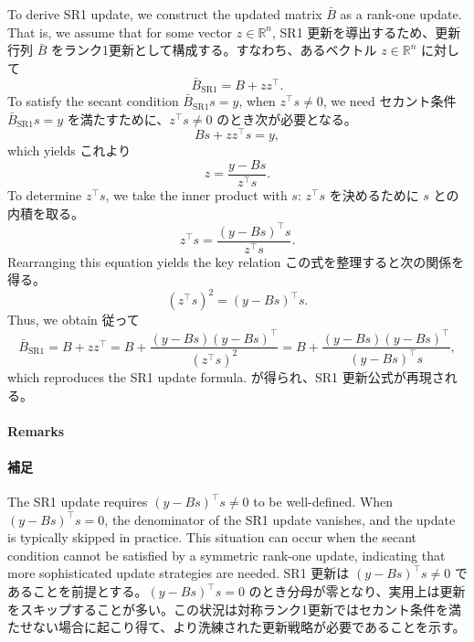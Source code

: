 \documentclass[0_main]{subfiles}
\begin{document}
\ifEn
    To derive SR1 update, we construct the updated matrix $\bar{B}$ as a rank-one update. That is, we assume that for some vector $z \in \mathbb{R}^n$,
\else
    SR1 更新を導出するため、更新行列 $\bar{B}$ をランク1更新として構成する。すなわち、あるベクトル $z \in \mathbb{R}^n$ に対して
\fi
\begin{equation*}
    \bar{B}_{\mathrm{SR1}} = B + z z^\top.
\end{equation*}
\ifEn
    To satisfy the secant condition $\bar{B}_{\mathrm{SR1}} s = y$, when $z^\top s \neq 0$, we need
\else
    セカント条件 $\bar{B}_{\mathrm{SR1}} s = y$ を満たすために、$z^\top s \neq 0$ のとき次が必要となる。
\fi
\begin{equation*}
    B s + z z^\top s = y,
\end{equation*}
\ifEn
    which yields
\else
    これより
\fi
\begin{equation*}
    z = \frac{y - B s}{z^\top s}.
\end{equation*}
\ifEn
    To determine $z^\top s$, we take the inner product with $s$:
\else
    $z^\top s$ を決めるために $s$ との内積を取る。
\fi
\begin{equation*}
    z^\top s = \frac{(y - B s)^\top s}{z^\top s}.
\end{equation*}
\ifEn
    Rearranging this equation yields the key relation
\else
    この式を整理すると次の関係を得る。
\fi
\begin{equation*}
    (z^\top s)^2 = (y - B s)^\top s.
\end{equation*}
\ifEn
    Thus, we obtain
\else
    従って
\fi
\begin{equation*}
    \bar{B}_{\mathrm{SR1}}
    = B + z z^\top
    = B + \frac{(y - B s)(y - B s)^\top}{(z^\top s)^2}
    = B + \frac{(y - B s)(y - B s)^\top}{(y - B s)^\top s},
\end{equation*}
\ifEn
    which reproduces the SR1 update formula.
\else
    が得られ、SR1 更新公式が再現される。
\fi

\ifEn
    \paragraph{Remarks}
\else
    \paragraph{補足}
\fi

\ifEn
    The SR1 update requires $(y - Bs)^\top s \neq 0$ to be well-defined. When $(y - Bs)^\top s = 0$, the denominator of the SR1 update vanishes, and the update is typically skipped in practice. This situation can occur when the secant condition cannot be satisfied by a symmetric rank-one update, indicating that more sophisticated update strategies are needed.
\else
    SR1 更新は $(y - Bs)^\top s \neq 0$ であることを前提とする。$(y - Bs)^\top s = 0$ のとき分母が零となり、実用上は更新をスキップすることが多い。この状況は対称ランク1更新ではセカント条件を満たせない場合に起こり得て、より洗練された更新戦略が必要であることを示す。
\fi
\end{document}
